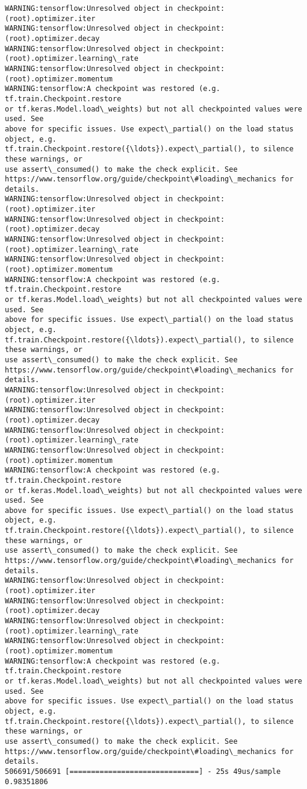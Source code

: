 \documentclass[11pt]{article}
\begin{document}
    \begin{Verbatim}[commandchars=\\\{\}]
WARNING:tensorflow:Unresolved object in checkpoint: (root).optimizer.iter
WARNING:tensorflow:Unresolved object in checkpoint: (root).optimizer.decay
WARNING:tensorflow:Unresolved object in checkpoint:
(root).optimizer.learning\_rate
WARNING:tensorflow:Unresolved object in checkpoint: (root).optimizer.momentum
WARNING:tensorflow:A checkpoint was restored (e.g. tf.train.Checkpoint.restore
or tf.keras.Model.load\_weights) but not all checkpointed values were used. See
above for specific issues. Use expect\_partial() on the load status object, e.g.
tf.train.Checkpoint.restore({\ldots}).expect\_partial(), to silence these warnings, or
use assert\_consumed() to make the check explicit. See
https://www.tensorflow.org/guide/checkpoint\#loading\_mechanics for details.
WARNING:tensorflow:Unresolved object in checkpoint: (root).optimizer.iter
WARNING:tensorflow:Unresolved object in checkpoint: (root).optimizer.decay
WARNING:tensorflow:Unresolved object in checkpoint:
(root).optimizer.learning\_rate
WARNING:tensorflow:Unresolved object in checkpoint: (root).optimizer.momentum
WARNING:tensorflow:A checkpoint was restored (e.g. tf.train.Checkpoint.restore
or tf.keras.Model.load\_weights) but not all checkpointed values were used. See
above for specific issues. Use expect\_partial() on the load status object, e.g.
tf.train.Checkpoint.restore({\ldots}).expect\_partial(), to silence these warnings, or
use assert\_consumed() to make the check explicit. See
https://www.tensorflow.org/guide/checkpoint\#loading\_mechanics for details.
WARNING:tensorflow:Unresolved object in checkpoint: (root).optimizer.iter
WARNING:tensorflow:Unresolved object in checkpoint: (root).optimizer.decay
WARNING:tensorflow:Unresolved object in checkpoint:
(root).optimizer.learning\_rate
WARNING:tensorflow:Unresolved object in checkpoint: (root).optimizer.momentum
WARNING:tensorflow:A checkpoint was restored (e.g. tf.train.Checkpoint.restore
or tf.keras.Model.load\_weights) but not all checkpointed values were used. See
above for specific issues. Use expect\_partial() on the load status object, e.g.
tf.train.Checkpoint.restore({\ldots}).expect\_partial(), to silence these warnings, or
use assert\_consumed() to make the check explicit. See
https://www.tensorflow.org/guide/checkpoint\#loading\_mechanics for details.
WARNING:tensorflow:Unresolved object in checkpoint: (root).optimizer.iter
WARNING:tensorflow:Unresolved object in checkpoint: (root).optimizer.decay
WARNING:tensorflow:Unresolved object in checkpoint:
(root).optimizer.learning\_rate
WARNING:tensorflow:Unresolved object in checkpoint: (root).optimizer.momentum
WARNING:tensorflow:A checkpoint was restored (e.g. tf.train.Checkpoint.restore
or tf.keras.Model.load\_weights) but not all checkpointed values were used. See
above for specific issues. Use expect\_partial() on the load status object, e.g.
tf.train.Checkpoint.restore({\ldots}).expect\_partial(), to silence these warnings, or
use assert\_consumed() to make the check explicit. See
https://www.tensorflow.org/guide/checkpoint\#loading\_mechanics for details.
506691/506691 [==============================] - 25s 49us/sample
0.98351806
    \end{Verbatim}
\end{document}
